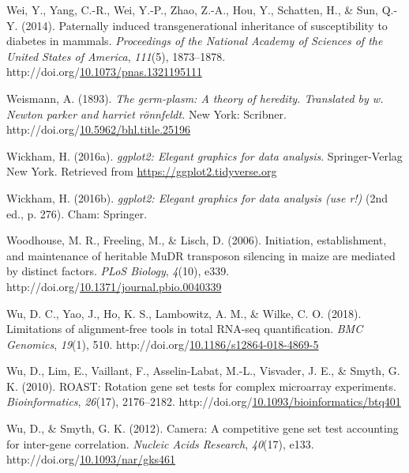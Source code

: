 \documentclass[12pt,twoside]{reedthesis}
\newlength{\cslhangindent}
\newenvironment{CSLReferences}[2] %
 {%
  \setlength{\parindent}{0pt}
  \ifodd #1 \everypar{\setlength{\hangindent}{\cslhangindent}}\ignorespaces\fi
  \ifnum #2 > 0
  \setlength{\parskip}{#2\baselineskip}
  \fi
 }%
 {}
\begin{document}
\begin{CSLReferences}{1}{0}
\leavevmode{}%
Wei, Y., Yang, C.-R., Wei, Y.-P., Zhao, Z.-A., Hou, Y., Schatten, H., \& Sun, Q.-Y. (2014). Paternally induced transgenerational inheritance of susceptibility to diabetes in mammals. \emph{Proceedings of the National Academy of Sciences of the United States of America}, \emph{111}(5), 1873--1878. http://doi.org/\href{https://doi.org/10.1073/pnas.1321195111}{10.1073/pnas.1321195111}

\leavevmode{}%
Weismann, A. (1893). \emph{The germ-plasm: A theory of heredity. Translated by w. Newton parker and harriet rönnfeldt.} New York: Scribner. http://doi.org/\href{https://doi.org/10.5962/bhl.title.25196}{10.5962/bhl.title.25196}

\leavevmode{}%
Wickham, H. (2016a). \emph{ggplot2: Elegant graphics for data analysis}. Springer-Verlag New York. Retrieved from \url{https://ggplot2.tidyverse.org}

\leavevmode{}%
Wickham, H. (2016b). \emph{ggplot2: Elegant graphics for data analysis (use r!)} (2nd ed., p. 276). Cham: Springer.

\leavevmode{}%
Woodhouse, M. R., Freeling, M., \& Lisch, D. (2006). Initiation, establishment, and maintenance of heritable MuDR transposon silencing in maize are mediated by distinct factors. \emph{PLoS Biology}, \emph{4}(10), e339. http://doi.org/\href{https://doi.org/10.1371/journal.pbio.0040339}{10.1371/journal.pbio.0040339}

\leavevmode{}%
Wu, D. C., Yao, J., Ho, K. S., Lambowitz, A. M., \& Wilke, C. O. (2018). Limitations of alignment-free tools in total RNA-seq quantification. \emph{BMC Genomics}, \emph{19}(1), 510. http://doi.org/\href{https://doi.org/10.1186/s12864-018-4869-5}{10.1186/s12864-018-4869-5}

\leavevmode{}%
Wu, D., Lim, E., Vaillant, F., Asselin-Labat, M.-L., Visvader, J. E., \& Smyth, G. K. (2010). ROAST: Rotation gene set tests for complex microarray experiments. \emph{Bioinformatics}, \emph{26}(17), 2176--2182. http://doi.org/\href{https://doi.org/10.1093/bioinformatics/btq401}{10.1093/bioinformatics/btq401}

\leavevmode{}%
Wu, D., \& Smyth, G. K. (2012). Camera: A competitive gene set test accounting for inter-gene correlation. \emph{Nucleic Acids Research}, \emph{40}(17), e133. http://doi.org/\href{https://doi.org/10.1093/nar/gks461}{10.1093/nar/gks461}


\end{CSLReferences}
\end{document}

